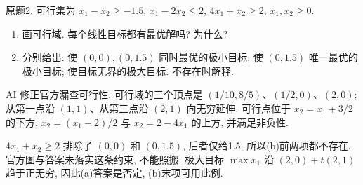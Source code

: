 \begin{exercise}\label{ass:15053-rec2-q2}
原题2. 可行集为 $x_1-x_2\ge-1.5$, $x_1-2x_2\le2$, $4x_1+x_2\ge2$, $x_1,x_2\ge0$.
\begin{enumerate}[label=(\alph*)]
\item 画可行域. 每个线性目标都有最优解吗? 为什么?
\item 分别给出: 使 $(0,0),(0,1.5)$ 同时最优的极小目标; 使 $(0,1.5)$ 唯一最优的极小目标; 使目标无界的极大目标. 不存在时解释.
\end{enumerate}
\end{exercise}
\begin{solution}
AI 修正官方漏查可行性. 可行域的三个顶点是 $(1/10,8/5)$、$(1/2,0)$、$(2,0)$; 从第一点沿 $(1,1)$、从第三点沿 $(2,1)$ 向无穷延伸. 可行点位于 $x_2=x_1+3/2$ 的下方, $x_2=(x_1-2)/2$ 与 $x_2=2-4x_1$ 的上方, 并满足非负性.
\begin{center}\end{center} $4x_1+x_2\ge2$ 排除了 $(0,0)$ 和 $(0,1.5)$, 后者仅给1.5, 所以(b)前两项都不存在. 官方图与答案未落实这条约束, 不能照搬. 极大目标 $\max x_1$ 沿 $(2,0)+t(2,1)$ 趋于正无穷, 因此(a)答案是否定, (b)末项可用此例.
\end{solution}

